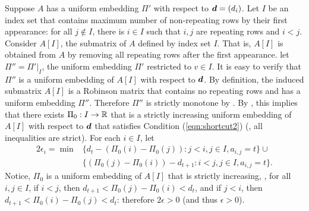 \documentclass[runningheads]{llncs}
\begin{document}
% 
\begin{proofof}{}
Suppose $A$ has a uniform embedding $\Pi'$ with respect to $\boldsymbol d = (d_i)$. Let $I$ be an index set that contains maximum number of non-repeating rows by their first appearance: for all $j\not\in I$, there is $i\in I$ such that $i,j$ are repeating rows and $i<j$.  
Consider $A[I]$, the submatrix of $A$ defined by index set $I$. That is,  $A[I]$ is obtained from $A$ by removing all repeating rows after the first appearance. 
 let $\Pi'' = \Pi'|_{I}$, the uniform embedding $\Pi'$ restricted to $v\in I$. It is easy to verify that $\Pi''$ is a uniform embedding of $A[I]$ with respect to $\boldsymbol d$.
By definition, the induced submatrix $A[I]$ is a Robinson matrix that contains no repeating rows and has a uniform embedding $\Pi''$. Therefore $\Pi''$ is strictly monotone by . By 
 , this implies that there exists $\Pi_0:I\to\mathbb R$ that is a strictly increasing uniform embedding of $A[I]$ with respect to $\boldsymbol d$ that satisfies Condition (\ref{eqn:shortcut2}) (\ie, all inequalities are strict).
For each $i\in I$, let 
\begin{equation}\label{eqn:thm:monotone}
\begin{split}
    2\epsilon_i = \min & 
\{d_{t}- (\Pi_0(i)-\Pi_0(j)):j<i, j\in I, a_{i,j}=t\} \cup \\ 
&\{(\Pi_0(j)-\Pi_0(i))-d_{t+1}: i<j, j\in I,  a_{i,j} = t \}.
\end{split}
\end{equation}
Notice, $\Pi_0$ is a uniform embedding of $A[I]$ that is strictly increasing, \ie, for all $i,j\in I$, if $i<j$, then $d_{t+1} < \Pi_0(j)-\Pi_0(i)<d_t$, 
and if $j<i$, then $d_{t+1}<\Pi_0(i)-\Pi_0(j) < d_t$: therefore $2\epsilon>0$ (and thus $\epsilon>0$). 



\end{proofof}
\end{document}
